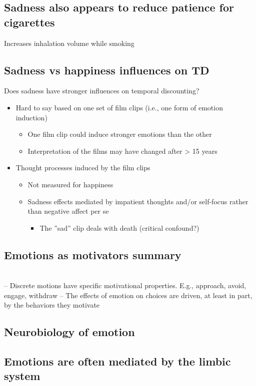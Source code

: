 \subsection{Sadness also appears to reduce patience for cigarettes}
Increases inhalation volume while smoking

\subsection{Sadness vs happiness influences on TD}
Does sadness have stronger influences on temporal discounting?
\begin{itemize}
    \item Hard to say based on one set of film clips (i.e., one form of emotion induction)
\begin{itemize}
    \item One film clip could induce stronger emotions than the other
\item Interpretation of the films may have changed after > 15 years
\end{itemize}
\item Thought processes induced by the film clips
\begin{itemize}
    \item Not measured for happiness
\item Sadness effects mediated by impatient thoughts and/or self-focus rather than negative
affect per se
\begin{itemize}
    \item The ”sad” clip deals with death (critical confound?)
\end{itemize}
\end{itemize}
\end{itemize}


\subsection{Emotions as motivators summary}
\\– Discrete motions have specific motivational properties. E.g., approach, avoid, engage, withdraw
– The effects of emotion on choices are driven, at least in part, by the behaviors they
motivate
\subsection{Neurobiology of emotion}

\subsection{Emotions are often mediated by the limbic system}
